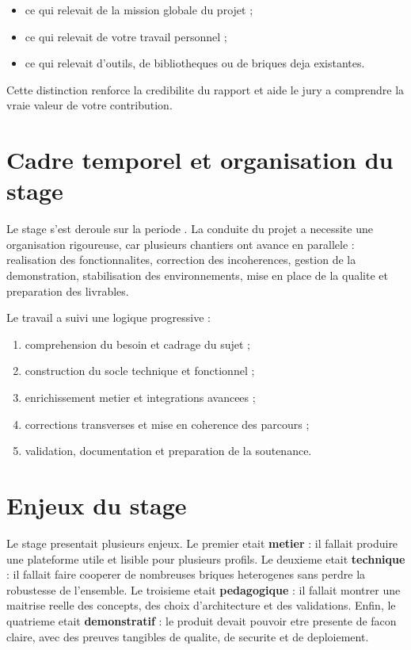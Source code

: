 \begin{itemize}[leftmargin=1.2cm]
  \item ce qui relevait de la mission globale du projet ;
  \item ce qui relevait de votre travail personnel ;
  \item ce qui relevait d'outils, de bibliotheques ou de briques deja existantes.
\end{itemize}

Cette distinction renforce la credibilite du rapport et aide le jury a comprendre la vraie valeur de votre contribution.

\section{Cadre temporel et organisation du stage}

Le stage s'est deroule sur la periode \PeriodeStage. La conduite du projet a necessite une organisation rigoureuse, car plusieurs chantiers ont avance en parallele : realisation des fonctionnalites, correction des incoherences, gestion de la demonstration, stabilisation des environnements, mise en place de la qualite et preparation des livrables.

Le travail a suivi une logique progressive :

\begin{enumerate}[leftmargin=1.2cm]
  \item comprehension du besoin et cadrage du sujet ;
  \item construction du socle technique et fonctionnel ;
  \item enrichissement metier et integrations avancees ;
  \item corrections transverses et mise en coherence des parcours ;
  \item validation, documentation et preparation de la soutenance.
\end{enumerate}

\section{Enjeux du stage}

Le stage presentait plusieurs enjeux. Le premier etait \textbf{metier} : il fallait produire une plateforme utile et lisible pour plusieurs profils. Le deuxieme etait \textbf{technique} : il fallait faire cooperer de nombreuses briques heterogenes sans perdre la robustesse de l'ensemble. Le troisieme etait \textbf{pedagogique} : il fallait montrer une maitrise reelle des concepts, des choix d'architecture et des validations. Enfin, le quatrieme etait \textbf{demonstratif} : le produit devait pouvoir etre presente de facon claire, avec des preuves tangibles de qualite, de securite et de deploiement.

